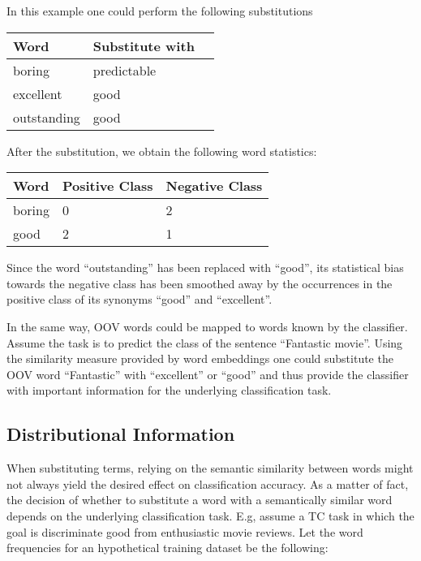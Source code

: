 In this example one could perform the following substitutions

\begin{center}
\begin{tabular}{l|l|l}
\textbf{Word} & \textbf{Substitute with}  \\
\hline
boring & predictable \\
excellent & good \\
outstanding & good \\
\end{tabular}
\end{center}

After the substitution, we obtain the following word statistics:

\begin{center}
\begin{tabular}{l|l|l}
\textbf{Word} & \textbf{Positive Class} & \textbf{Negative Class}  \\
\hline
boring & 0 & 2 \\
good & 2 & 1 \\
\end{tabular}
\end{center}

Since the word ``outstanding'' has been replaced with ``good'', its
statistical bias towards the negative class has been smoothed away by the
occurrences in the positive class of its synonyms ``good'' and ``excellent''.
 
In the same way, OOV words could be mapped to words known by the
classifier. Assume the task is to predict the class of the sentence ``Fantastic movie''. 
Using the similarity measure provided by word embeddings one could substitute
the OOV word ``Fantastic'' with ``excellent'' or ``good'' and thus provide the
classifier with important information for the underlying classification task.

\subsection{Distributional Information}
When substituting terms, relying on the semantic similarity between
words might not always yield the desired effect on classification
accuracy. As a matter of fact, the decision of whether to substitute
a word with a semantically similar word depends on the underlying
classification task.
E.g, assume a TC task in which the goal is discriminate good from enthusiastic
movie reviews. Let the word frequencies for an hypothetical training dataset be the following:

